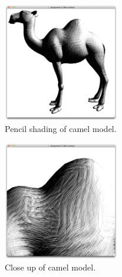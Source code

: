     \begin{figure}
      \centering
      \includegraphics[width=0.45\textwidth]{images/pencil-3}
      \caption{Pencil shading of camel model.}
      \label{pencil3}
    \end{figure}

    \begin{figure}
      \centering
      \includegraphics[width=0.45\textwidth]{images/pencil-4}
      \caption{Close up of camel model.}
      \label{pencil4}
    \end{figure}

